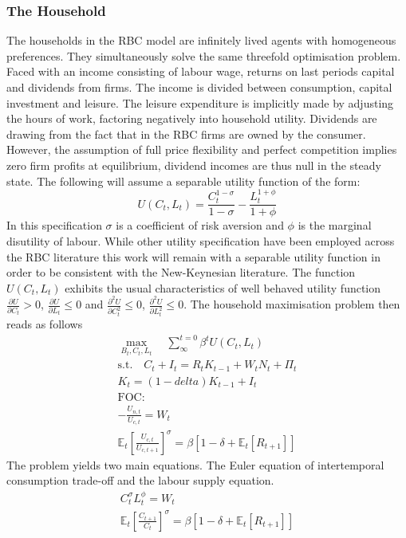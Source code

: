 \documentclass[12pt,a4paper,english]{article} %
\newcommand{\E}{\mathbb{E}} %
\begin{document}
	\subsubsection{The Household}
	The households in the RBC model are infinitely lived agents with homogeneous preferences. They simultaneously solve the same threefold optimisation problem. Faced with an income consisting of labour wage, returns on last periods capital and dividends from firms. The income is divided between consumption, capital investment and leisure. The leisure expenditure is implicitly made by adjusting the hours of work, factoring negatively into household utility. Dividends are drawing from the fact that in the RBC firms are owned by the consumer. However, the assumption of full price flexibility and perfect competition implies zero firm profits at equilibrium, dividend incomes are thus null in the steady state. The following will assume a separable utility function of the form: 
	\begin{equation}
		U(C_t, L_t) = \frac{C_t^{1-\sigma}}{{1-\sigma}} - \frac{L_t^{1+\phi}}{1+\phi} 
	\end{equation}
	In this specification $\sigma$ is a coefficient of risk aversion and $\phi$ is the marginal disutility of labour. While other utility specification have been employed across the RBC literature this work will remain with a separable utility function in order to be consistent with the New-Keynesian literature. The function $U(C_t, L_t)$ exhibits the usual characteristics of well behaved utility function $\frac{\partial U}{\partial C_t} > 0$, $\frac{\partial U}{\partial L_t} \leq 0$ and $\frac{\partial^2 U}{\partial C_t^2} \leq 0$, $\frac{\partial^2 U}{\partial L_t^2} \leq 0$.
	The household maximisation problem then reads as follows
	\begin{equation}
		\begin{aligned}
			\max_{B_t, C_t, L_t} \quad \sum_{\infty}^{t=0} \beta^{t} U(C_{t}, L_{t}) \\
			\textrm{s.t.} \quad C_t + I_t = R_t K_{t-1} + W_t N_t + \Pi_t \\
						  K_t = (1 - delta) K_{t-1} + I_t \\
			\textrm{FOC:} \\
			- \frac{U_{n,t}}{U_{c, t}} = W_t \\
			\E_t \left[ \frac{U_{c,t}}{U_{c,t+1}} \right]^{\sigma} = \beta \left[ 1 - \delta + \E_t[R_{t+1}]\right]
		\end{aligned}
	\end{equation}
	The problem yields two main equations. The Euler equation of intertemporal consumption trade-off and the labour supply equation. 
	\begin{equation}
		\begin{aligned}
			C_t^\sigma L_t^\phi	= W_t \\
			\E_t \left[ \frac{C_{t+1}}{C_t} \right]^\sigma = \beta \left[ 1 - \delta  + \E_t [R_{t+1}] \right] 			
		\end{aligned}
	\end{equation}
	
\end{document}
